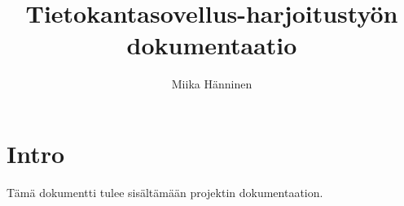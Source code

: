 \documentclass[a4paper]{article}
\title{Tietokantasovellus-harjoitustyön dokumentaatio}
\author{Miika Hänninen}
\begin{document}
\maketitle
\tableofcontents
\section{Intro}
Tämä dokumentti tulee sisältämään projektin dokumentaation.
\end{document}

